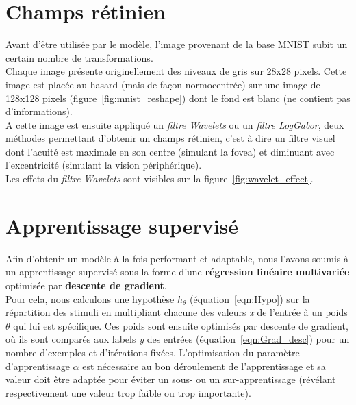 \section{Champs rétinien} %

Avant d'être utilisée par le modèle, l'image provenant de la base MNIST subit un certain nombre de transformations.\\
Chaque image présente originellement des niveaux de gris sur 28x28 pixels. Cette image est placée au hasard (mais de façon normocentrée) sur une image de 128x128 pixels (figure~\ref{fig:mnist_reshape}) dont le fond est blanc (ne contient pas d'informations).\\
A cette image est ensuite appliqué un \textit{filtre Wavelets} ou un \textit{filtre LogGabor}, deux méthodes permettant d'obtenir un champs rétinien, c'est à dire un filtre visuel dont l'acuité est maximale en son centre (simulant la fovea) et diminuant avec l'excentricité (simulant la vision périphérique).\\
Les effets du \textit{filtre Wavelets} sont visibles sur la figure~\ref{fig:wavelet_effect}.


\section{Apprentissage supervisé} %

Afin d'obtenir un modèle à la fois performant et adaptable, nous l'avons soumis à un apprentissage supervisé sous la forme d'une \textbf{régression linéaire multivariée} optimisée par \textbf{descente de gradient}.\\
Pour cela, nous calculons une hypothèse $h_{\theta}$ (équation~\ref{eqn:Hypo}) sur la répartition des stimuli en multipliant chacune des valeurs \textit{x} de l'entrée à un poids $\theta$ qui lui est spécifique. Ces poids sont ensuite optimisés par descente de gradient, où ils sont comparés aux labels \textit{y} des entrées (équation~\ref{eqn:Grad_desc}) pour un nombre d'exemples et d'itérations fixées. L'optimisation du paramètre d'apprentissage $\alpha$ est nécessaire au bon déroulement de l'apprentissage et sa valeur doit être adaptée pour éviter un sous- ou un sur-apprentissage (révélant respectivement une valeur trop faible ou trop importante).\\

